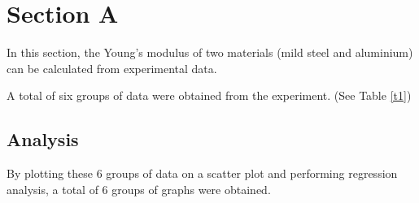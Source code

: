 \section*{Section A}
\label{sec:Section A}
\FloatBarrier %


In this section, the Young's modulus of two materials 
(mild steel and aluminium) can be calculated from experimental data.

A total of six groups of data were obtained from the experiment. (See Table \ref{t1})


\subsection*{Analysis}

By plotting these 6 groups of data on a scatter plot and performing 
regression analysis, a total of 6 groups of graphs were obtained.

